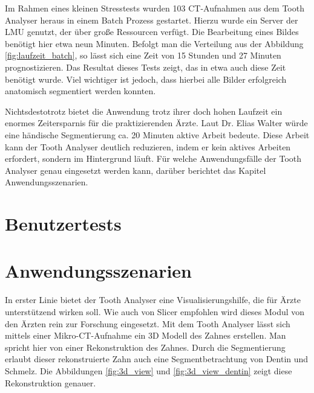 Im Rahmen eines kleinen Stresstests wurden 103 \ac{CT}-Aufnahmen aus dem Tooth
Analyser heraus in einem Batch Prozess gestartet. Hierzu wurde ein Server der \ac{LMU}
genutzt, der über große Ressourcen verfügt. Die Bearbeitung eines Bildes
benötigt hier etwa neun Minuten. Befolgt man die Verteilung aus der Abbildung \ref{fig:laufzeit_batch},
so lässt sich eine Zeit von 15 Stunden und 27 Minuten prognostizieren. Das Resultat
dieses Tests zeigt, das in etwa auch diese Zeit benötigt wurde. Viel wichtiger ist
jedoch, dass hierbei alle Bilder erfolgreich anatomisch segmentiert werden
konnten.

Nichtsdestotrotz bietet die Anwendung trotz ihrer doch hohen Laufzeit ein
enormes Zeitersparnis für die praktizierenden Ärzte. Laut Dr. Elias Walter würde
eine händische Segmentierung ca. 20 Minuten aktive Arbeit bedeute. Diese Arbeit
kann der Tooth Analyser deutlich reduzieren, indem er kein aktives Arbeiten erfordert,
sondern im Hintergrund läuft. Für welche Anwendungsfälle der Tooth Analyser genau
eingesetzt werden kann, darüber berichtet das Kapitel Anwendungsszenarien.

\section{Benutzertests}
\label{sec:benutzertests}

\section{Anwendungsszenarien}
In erster Linie bietet der Tooth Analyser eine Visualisierungshilfe, die für
Ärzte unterstützend wirken soll. Wie auch von Slicer empfohlen wird dieses Modul
von den Ärzten rein zur Forschung eingesetzt. Mit dem Tooth Analyser lässt sich
mittels einer Mikro-\ac{CT}-Aufnahme ein 3D Modell des Zahnes erstellen. Man
spricht hier von einer Rekonstruktion des Zahnes. Durch die Segmentierung erlaubt
dieser rekonstruierte Zahn auch eine Segmentbetrachtung von Dentin und Schmelz.
Die Abbildungen \ref{fig:3d_view} und \ref{fig:3d_view_dentin} zeigt diese
Rekonstruktion genauer.

